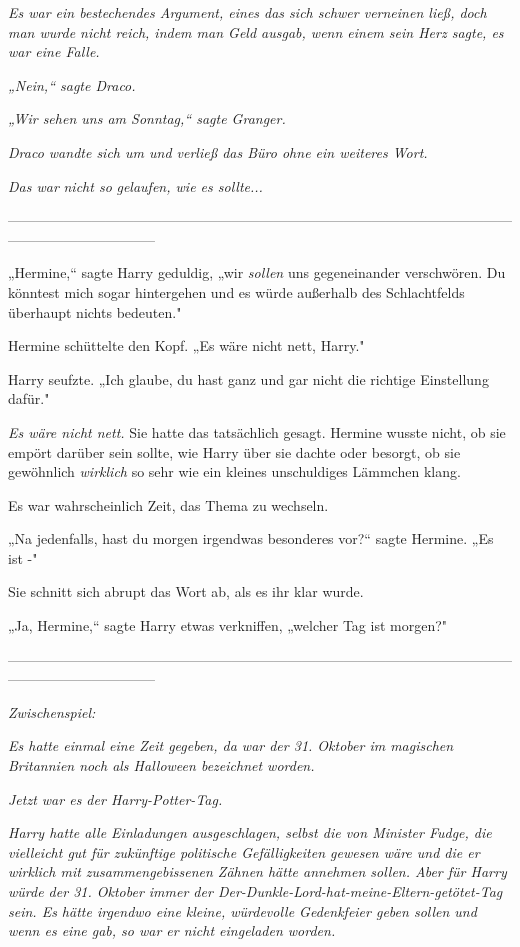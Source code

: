 {\emph{Es war ein bestechendes Argument, eines das sich schwer verneinen ließ, doch man wurde nicht reich, indem man Geld ausgab, wenn einem sein Herz sagte, es war eine Falle.}

\emph{„Nein,“ sagte Draco.}

\emph{„Wir sehen uns am Sonntag,“ sagte Granger.}

\emph{Draco wandte sich um und verließ das Büro ohne ein weiteres Wort.}

\emph{Das war} \emph{\emph{nicht so}} \emph{gelaufen, wie es sollte...}

--------------------------------------------------------------------------------------------------------------------------------------------

\hfill\break „Hermine,“ sagte Harry geduldig, „wir \emph{sollen} uns gegeneinander verschwören. Du könntest mich sogar hintergehen und es würde außerhalb des Schlachtfelds überhaupt nichts bedeuten."

Hermine schüttelte den Kopf. „Es wäre nicht nett, Harry."

Harry seufzte. „Ich glaube, du hast ganz und gar nicht die richtige Einstellung dafür."

\emph{Es wäre nicht nett.} Sie hatte das tatsächlich gesagt. Hermine wusste nicht, ob sie empört darüber sein sollte, wie Harry über sie dachte oder besorgt, ob sie gewöhnlich \emph{wirklich} so sehr wie ein kleines unschuldiges Lämmchen klang.

Es war wahrscheinlich Zeit, das Thema zu wechseln.

„Na jedenfalls, hast du morgen irgendwas besonderes vor?“ sagte Hermine. „Es ist -"

Sie schnitt sich abrupt das Wort ab, als es ihr klar wurde.

„Ja, Hermine,“ sagte Harry etwas verkniffen, „welcher Tag ist morgen?"

--------------------------------------------------------------------------------------------------------------------------------------------

\hfill\break \emph{\emph{Zwischenspiel:}}

\emph{Es hatte einmal eine Zeit gegeben, da war der 31. Oktober im magischen Britannien noch als Halloween bezeichnet worden.}

\emph{Jetzt war es der Harry-Potter-Tag.}

\emph{Harry hatte alle Einladungen ausgeschlagen, selbst die von Minister Fudge, die vielleicht gut für zukünftige politische Gefälligkeiten gewesen wäre und die er wirklich mit zusammengebissenen Zähnen hätte annehmen sollen. Aber für Harry würde der 31. Oktober immer der Der-Dunkle-Lord-hat-meine-Eltern-getötet-Tag sein. Es hätte irgendwo eine kleine, würdevolle Gedenkfeier geben sollen und wenn es eine gab, so war er nicht eingeladen worden.}

}
